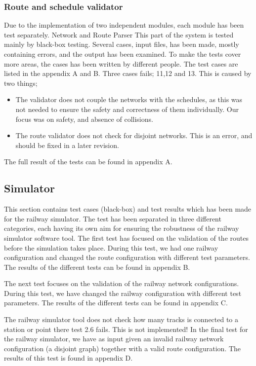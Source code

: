 \documentclass[10pt,a4paper]{article}
\begin{document}
\subsubsection{Route and schedule validator}
Due to the implementation of two independent modules, each module has been test separately.
Network and Route Parser
This part of the system is tested mainly by black-box testing. Several cases, input files, has been made, mostly containing errors, and the output has been examined. To make the tests cover more areas, the cases has been written by different people.
The test cases are listed in the appendix A and B.
Three cases fails; 11,12 and 13. This is caused by two things; 
\begin{itemize}
  \item The validator does not couple the networks with the schedules, as this was not needed to ensure the safety and correctness of them individually. Our focus was on safety, and absence of collisions.
  \item The route validator does not check for disjoint networks. This is an error, and should be fixed in a later revision.
\end{itemize}

The full result of the tests can be found in appendix A.

\subsection{Simulator}
This section contains test cases (black-box) and test results which has been made for the railway simulator. 
The test has been separated in three different categories, each having its own aim for ensuring the robustness of the railway simulator software tool. 
The first test has focused on the validation of the routes before the simulation takes place. During this test, we had one railway configuration and changed the route configuration with different test parameters. The results of the different tests can be found in appendix B.

The next test focuses on the validation of the railway network configurations. During this test, we have changed the railway configuration with different test parameters. The results of the different tests can be found in appendix C.

The railway simulator tool does not check how many tracks is connected to a station or point there test 2.6 fails. This is not implemented! 
In the final test for the railway simulator, we have as input given an invalid railway network configuration (a disjoint graph) together with a valid route configuration.
The results of this test is found in appendix D.
\end{document}
